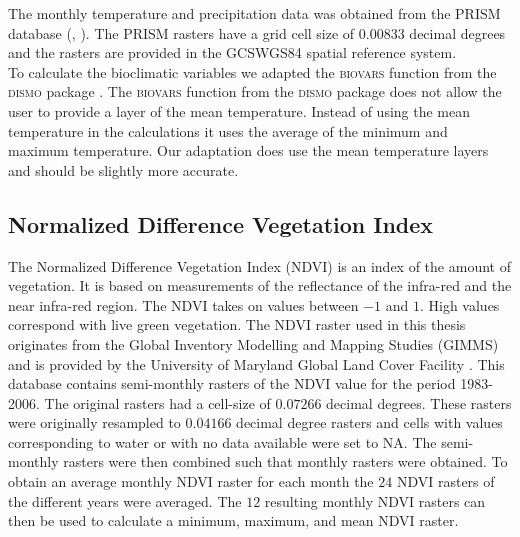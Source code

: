 The monthly temperature and precipitation data was obtained from the PRISM database (\cite{daly_knowledge-based_2002}, \citeauthor{PRISM}). The PRISM rasters have a grid cell size of $0.00833$ decimal degrees and the rasters are provided in the GCS\textunderscore WGS84 spatial reference system. \\ 

To calculate the bioclimatic variables we adapted the \textsc{biovars} function from the \textsc{dismo} package \parencite{dismo}. The \textsc{biovars} function from the \textsc{dismo} package does not allow the user to provide a layer of the mean temperature. Instead of using the mean temperature in the calculations it uses the average of the minimum and maximum temperature. Our adaptation does use the mean temperature layers and should be slightly more accurate.

\subsection{Normalized Difference Vegetation Index}
The Normalized Difference Vegetation Index (NDVI) is an index of the amount of vegetation. It is based on measurements of the reflectance of the infra-red and the near infra-red region. The NDVI takes on values between $-1$ and $1$. High values correspond with live green vegetation. The NDVI raster used in this thesis originates from the Global Inventory Modelling and Mapping Studies (GIMMS) and is provided by the University of Maryland Global Land Cover Facility \parencite{pinzon2005satellite, tucker2005extended}. This database contains semi-monthly rasters of the NDVI value for the period 1983-2006. The original rasters had a cell-size of $0.07266$ decimal degrees. These rasters were originally  resampled to $0.04166$ decimal degree rasters and cells with values corresponding to water or with no data available were set to \textsc{NA}. The semi-monthly rasters were then combined such that monthly rasters were obtained. To obtain an average monthly NDVI raster for each month the $24$ NDVI rasters of the different years were averaged. The $12$ resulting monthly NDVI rasters can then be used to calculate a minimum, maximum, and mean NDVI raster.

